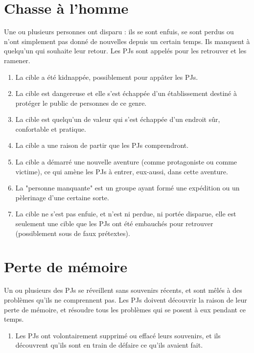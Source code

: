 \begin{multicols}{2}
\section{Chasse à l'homme}
\label{chasse}


Une ou plusieurs personnes ont disparu : ils se sont enfuis, se sont perdus ou n'ont simplement pas donné de nouvelles depuis un certain temps. Ils manquent à quelqu'un qui souhaite leur retour. Les PJs sont appelés pour les retrouver et les ramener.

\themes
\begin{enumerate}
\item La cible a été kidnappée, possiblement pour appâter les PJs.
\item La cible est dangereuse et elle s'est échappée d'un établissement destiné à protéger le public de personnes de ce genre.
\item La cible est quelqu'un de valeur qui s'est échappée d'un endroit sûr, confortable et pratique.
\item La cible a une raison de partir que les PJs comprendront.
\item La cible a démarré une nouvelle aventure (comme protagoniste ou comme victime), ce qui amène les PJs à entrer, eux-aussi, dans cette aventure.
\item La "personne manquante" est un groupe ayant formé une expédition ou un pèlerinage d'une certaine sorte.
\item La cible ne s'est pas enfuie, et n'est ni perdue, ni portée disparue, elle est seulement une cible que les PJs ont été embauchés pour retrouver (possiblement sous de faux prétextes).
\end{enumerate}

\section{Perte de mémoire}
\label{memoire}


Un ou plusieurs des PJs se réveillent sans souvenirs récents, et sont mêlés à des problèmes qu'ils ne comprennent pas. Les PJs doivent découvrir la raison de leur perte de mémoire, et résoudre tous les problèmes qui se posent à eux pendant ce temps.

\themes
\begin{enumerate}
\item Les PJs ont volontairement supprimé ou effacé leurs souvenirs, et ils découvrent qu'ils sont en train de défaire ce qu'ils avaient fait.
\end{enumerate}


\end{multicols}
